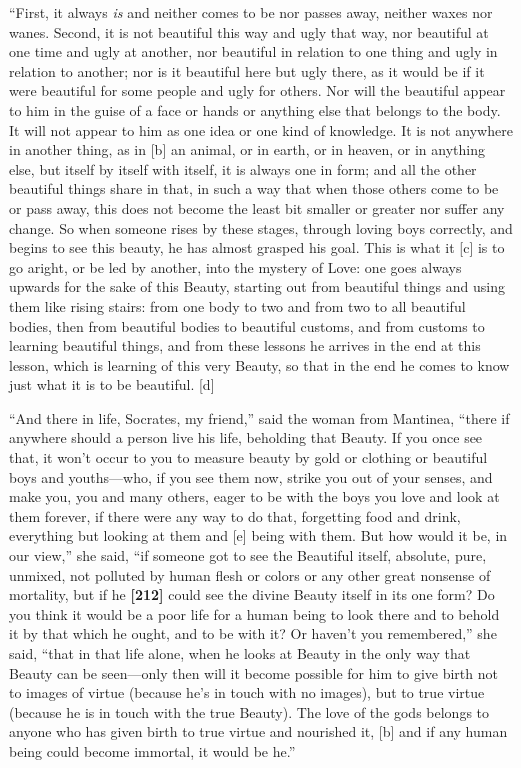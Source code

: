 “First, it always {\em is} and neither comes to be nor passes away,
neither waxes nor wanes. Second, it is not beautiful this way and ugly
that way, nor beautiful at one time and ugly at another, nor beautiful
in relation to one thing and ugly in relation to another; nor is it
beautiful here but ugly there, as it would be if it were beautiful for
some people and ugly for others. Nor will the beautiful appear to him in
the guise of a face or hands or anything else that belongs to the body.
It will not appear to him as one idea or one kind of knowledge. It is
not anywhere in another thing, as in {[}b{]} an animal, or in earth, or
in heaven, or in anything else, but itself by itself with itself, it is
always one in form; and all the other beautiful things share in that, in
such a way that when those others come to be or pass away, this does not
become the least bit smaller or greater nor suffer any change. So when
someone rises by these stages, through loving boys correctly, and begins
to see this beauty, he has almost grasped his goal. This is what it
{[}c{]} is to go aright, or be led by another, into the mystery of Love:
one goes always upwards for the sake of this Beauty, starting out from
beautiful things and using them like rising stairs: from one body to two
and from two to all beautiful bodies, then from beautiful bodies to
beautiful customs, and from customs to learning beautiful things, and
from these lessons he
arrives in the end at
this lesson, which is learning of this very Beauty, so that in the end
he comes to know just what it is to be beautiful. {[}d{]}

“And there in life, Socrates, my friend,” said the woman from Mantinea,
“there if anywhere should a person live his life, beholding that Beauty.
If you once see that, it won't occur to you to measure beauty by gold or
clothing or beautiful boys and youths---who, if you see them now, strike
you out of your senses, and make you, you and many others, eager to be
with the boys you love and look at them forever, if there were any way
to do that, forgetting food and drink, everything but looking at them
and {[}e{]} being with them. But how would it be, in our view,” she
said, “if someone got to see the Beautiful itself, absolute, pure,
unmixed, not polluted by human flesh or colors or any other great
nonsense of mortality, but if he {\bf {[}212{]}} could see the divine
Beauty itself in its one form? Do you think it would be a poor life for
a human being to look there and to behold it by that which he ought, and
to be with it? Or haven't you remembered,” she said, “that in that life
alone, when he looks at Beauty in the only way that Beauty can be
seen---only then will it become possible for him to give birth not to
images of virtue (because he's in touch with no images), but to true
virtue (because he is in touch with the true Beauty). The love of the
gods belongs to anyone who has given birth to true virtue and nourished
it, {[}b{]} and if any human being could become immortal, it would be
he.”

